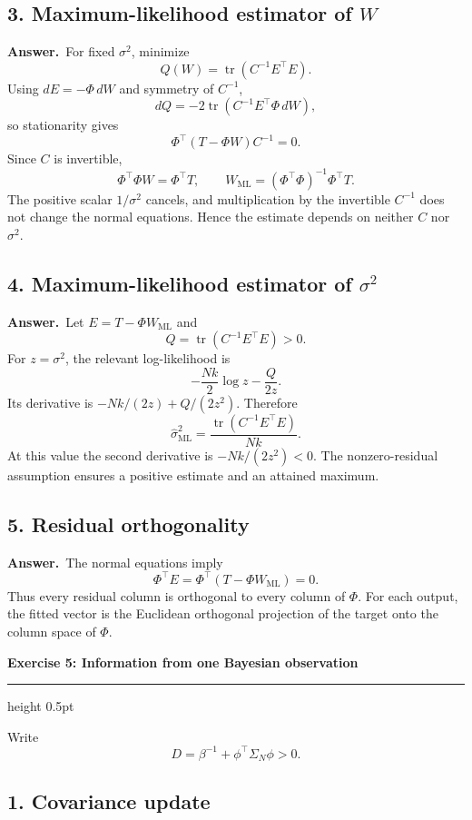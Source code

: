 \documentclass[11pt,a4paper]{article}
\newcommand{\exercise}[2]{%
  \Needspace{8\baselineskip}%
  \par\addvspace{1.1em}%
  {\Large\bfseries\color{examblue}Exercise #1: #2\par}%
  \nobreak\vspace{0.2em}%
  {\color{rulegray}\hrule height 0.5pt}%
  \vspace{0.55em}%
}
\newcommand{\answer}{\textbf{Answer.}\ }
\begin{document}
\subsection*{3. Maximum-likelihood estimator of $W$}

\answer For fixed $\sigma^2$, minimize
\[
  Q(W)=\operatorname{tr}(C^{-1}E^\top E).
\]
Using $dE=-\Phi\,dW$ and symmetry of $C^{-1}$,
\[
  dQ=-2\operatorname{tr}(C^{-1}E^\top\Phi\,dW),
\]
so stationarity gives
\[
  \Phi^\top(T-\Phi W)C^{-1}=0.
\]
Since $C$ is invertible,
\[
  \Phi^\top\Phi W=\Phi^\top T,
  \qquad
  \boxed{W_{\mathrm{ML}}
  =(\Phi^\top\Phi)^{-1}\Phi^\top T}.
\]
The positive scalar $1/\sigma^2$ cancels, and multiplication by the invertible $C^{-1}$ does not change the normal equations. Hence the estimate depends on neither $C$ nor $\sigma^2$.

\subsection*{4. Maximum-likelihood estimator of $\sigma^2$}

\answer Let $E=T-\Phi W_{\mathrm{ML}}$ and
\[
  Q=\operatorname{tr}(C^{-1}E^\top E)>0.
\]
For $z=\sigma^2$, the relevant log-likelihood is
\[
  -\frac{Nk}{2}\log z-\frac{Q}{2z}.
\]
Its derivative is $-Nk/(2z)+Q/(2z^2)$. Therefore
\[
  \boxed{\widehat\sigma_{\mathrm{ML}}^2
  =\frac{\operatorname{tr}(C^{-1}E^\top E)}{Nk}}.
\]
At this value the second derivative is $-Nk/(2z^2)<0$. The nonzero-residual assumption ensures a positive estimate and an attained maximum.

\subsection*{5. Residual orthogonality}

\answer The normal equations imply
\[
  \boxed{\Phi^\top E
  =\Phi^\top(T-\Phi W_{\mathrm{ML}})=0}.
\]
Thus every residual column is orthogonal to every column of $\Phi$. For each output, the fitted vector is the Euclidean orthogonal projection of the target onto the column space of $\Phi$.

\exercise{5}{Information from one Bayesian observation}

Write
\[
  D=\beta^{-1}+\phi^\top\Sigma_N\phi>0.
\]

\subsection*{1. Covariance update}
\end{document}
